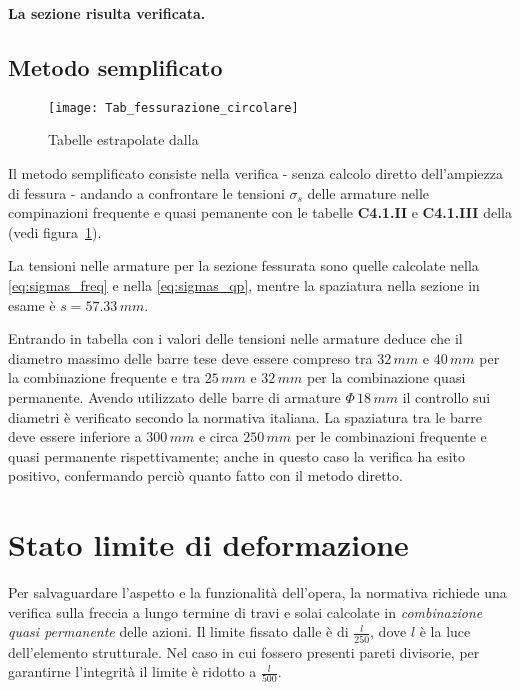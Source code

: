 \textbf{La sezione risulta verificata.}

\subsection{Metodo semplificato}

\begin{figure}
	\centering
	\texttt{[image: Tab\_fessurazione\_circolare]}
	\caption{Tabelle estrapolate dalla \circolare}
	\label{fig:tabelleFessurazioneCircolare}
\end{figure}

Il metodo semplificato consiste nella verifica - senza calcolo diretto dell'ampiezza di fessura - andando a confrontare le tensioni $\sigma_s$ delle armature nelle compinazioni frequente e quasi pemanente con le tabelle \textbf{C4.1.II} e \textbf{C4.1.III} della \circolare (vedi figura~\ref{fig:tabelleFessurazioneCircolare}). 

La tensioni nelle armature per la sezione fessurata sono quelle calcolate nella \eqref{eq:sigmas_freq} e nella \eqref{eq:sigmas_qp}, mentre la spaziatura nella sezione in esame è $s = 57.33\,mm$.

Entrando in tabella con i valori delle tensioni nelle armature deduce che il diametro massimo delle barre tese deve essere compreso tra $32\,mm$ e $40\,mm$ per la combinazione frequente e tra $25\,mm$ e $32\,mm$ per la combinazione quasi permanente. Avendo utilizzato delle barre di armature $\Phi\,18\,mm$ il controllo sui diametri è verificato secondo la normativa italiana. La spaziatura tra le barre deve essere inferiore a $300\,mm$ e circa $250\,mm$ per le combinazioni frequente e quasi permanente rispettivamente; anche in questo caso la verifica ha esito positivo, confermando perciò quanto fatto con il metodo diretto.

\section{Stato limite di deformazione}\label{sec:trave_deformazione_sle}
Per salvaguardare l'aspetto e la funzionalità dell'opera, la normativa richiede una verifica sulla freccia a lungo termine di travi e solai calcolate in  \textit{combinazione quasi permanente} delle azioni. Il limite fissato dalle \ntc è di $\frac{l}{250}$, dove $l$ è la luce dell'elemento strutturale. Nel caso in cui fossero presenti pareti divisorie, per garantirne l'integrità il limite è ridotto a $\frac{l}{500}$.

